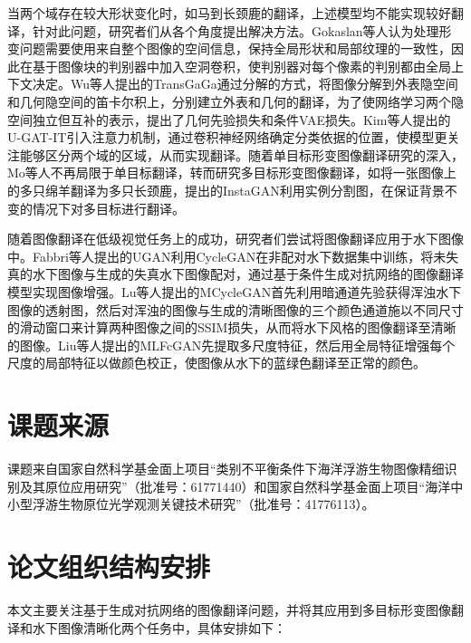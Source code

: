 当两个域存在较大形状变化时，如马到长颈鹿的翻译，上述模型均不能实现较好翻译，针对此问题，研究者们从各个角度提出解决方法。Gokaslan等人\cite{gokaslan2018improving}认为处理形变问题需要使用来自整个图像的空间信息，保持全局形状和局部纹理的一致性，因此在基于图像块的判别器中加入空洞卷积，使判别器对每个像素的判别都由全局上下文决定。Wu等人\cite{wu2019transgaga}提出的TransGaGa通过分解的方式，将图像分解到外表隐空间和几何隐空间的笛卡尔积上，分别建立外表和几何的翻译，为了使网络学习两个隐空间独立但互补的表示，提出了几何先验损失和条件VAE损失。Kim等人\cite{kim2019u}提出的U-GAT-IT引入注意力机制，通过卷积神经网络确定分类依据的位置，使模型更关注能够区分两个域的区域，从而实现翻译。随着单目标形变图像翻译研究的深入，Mo等人\cite{mo2018instagan}不再局限于单目标翻译，转而研究多目标形变图像翻译，如将一张图像上的多只绵羊翻译为多只长颈鹿，提出的InstaGAN利用实例分割图，在保证背景不变的情况下对多目标进行翻译。

随着图像翻译在低级视觉任务上的成功，研究者们尝试将图像翻译应用于水下图像中。Fabbri等人\cite{fabbri2018enhancing}提出的UGAN利用CycleGAN在非配对水下数据集中训练，将未失真的水下图像与生成的失真水下图像配对，通过基于条件生成对抗网络的图像翻译模型实现图像增强。Lu等人\cite{lu2019multi}提出的MCycleGAN首先利用暗通道先验获得浑浊水下图像的透射图，然后对浑浊的图像与生成的清晰图像的三个颜色通道施以不同尺寸的滑动窗口来计算两种图像之间的SSIM\cite{wang2004image}损失，从而将水下风格的图像翻译至清晰的图像。Liu等人\cite{liu2019mlfcgan}提出的MLFcGAN先提取多尺度特征，然后用全局特征增强每个尺度的局部特征以做颜色校正，使图像从水下的蓝绿色翻译至正常的颜色。

\section{课题来源}

课题来自国家自然科学基金面上项目“类别不平衡条件下海洋浮游生物图像精细识别及其原位应用研究”（批准号：61771440）和国家自然科学基金面上项目“海洋中小型浮游生物原位光学观测关键技术研究”（批准号：41776113）。

\section{论文组织结构安排}

本文主要关注基于生成对抗网络的图像翻译问题，并将其应用到多目标形变图像翻译和水下图像清晰化两个任务中，具体安排如下：

